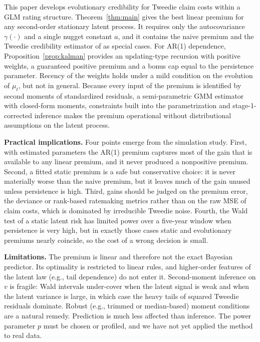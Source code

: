 \documentclass[mathematics,article,submit,moreauthors]{Definitions/mdpi}
\begin{document}
This paper develops evolutionary credibility for Tweedie claim costs within a GLM rating structure. Theorem~\ref{thm:main} gives the best linear premium for any second-order stationary latent process. It requires only the autocovariance $\gamma(\cdot)$ and a single nugget constant $a$, and it contains the naive premium and the Tweedie credibility estimator of \citet{ohlsson2006exact} as special cases. For AR(1) dependence, Proposition~\ref{prop:kalman} provides an updating-type recursion with positive weights, a guaranteed positive premium and a bonus cap equal to the persistence parameter. Recency of the weights holds under a mild condition on the evolution of $\mu_t$, but not in general. Because every input of the premium is identified by second moments of standardized residuals, a semi-parametric GMM estimator with closed-form moments, constraints built into the parametrization and stage-1-corrected inference makes the premium operational without distributional assumptions on the latent process.

\textbf{Practical implications.} Four points emerge from the simulation study. First, with estimated parameters the AR(1) premium captures most of the gain that is available to any linear premium, and it never produced a nonpositive premium. Second, a fitted static premium is a safe but conservative choice: it is never materially worse than the naive premium, but it leaves much of the gain unused unless persistence is high. Third, gains should be judged on the premium error, the deviance or rank-based ratemaking metrics rather than on the raw MSE of claim costs, which is dominated by irreducible Tweedie noise. Fourth, the Wald test of a static latent risk has limited power over a five-year window when persistence is very high, but in exactly those cases static and evolutionary premiums nearly coincide, so the cost of a wrong decision is small.

\textbf{Limitations.} The premium is linear and therefore not the exact Bayesian predictor. Its optimality is restricted to linear rules, and higher-order features of the latent law (e.g., tail dependence) do not enter it. Second-moment inference on $v$ is fragile: Wald intervals under-cover when the latent signal is weak and when the latent variance is large, in which case the heavy tails of squared Tweedie residuals dominate. Robust (e.g., trimmed or median-based) moment conditions are a natural remedy. Prediction is much less affected than inference. The power parameter $p$ must be chosen or profiled, and we have not yet applied the method to real data.
\end{document}
